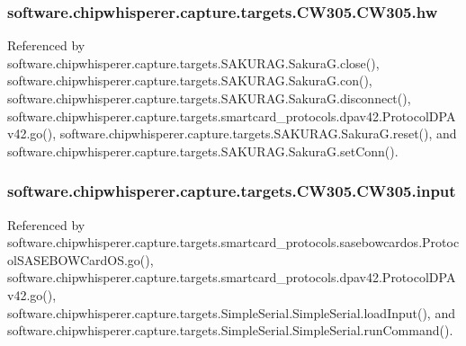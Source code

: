 \subsubsection[{hw}]{\setlength{\rightskip}{0pt plus 5cm}software.\+chipwhisperer.\+capture.\+targets.\+C\+W305.\+C\+W305.\+hw}\label{classsoftware_1_1chipwhisperer_1_1capture_1_1targets_1_1CW305_1_1CW305_a1197c766d752dac05af78820aed5604b}


Referenced by software.\+chipwhisperer.\+capture.\+targets.\+S\+A\+K\+U\+R\+A\+G.\+Sakura\+G.\+close(), software.\+chipwhisperer.\+capture.\+targets.\+S\+A\+K\+U\+R\+A\+G.\+Sakura\+G.\+con(), software.\+chipwhisperer.\+capture.\+targets.\+S\+A\+K\+U\+R\+A\+G.\+Sakura\+G.\+disconnect(), software.\+chipwhisperer.\+capture.\+targets.\+smartcard\+\_\+protocols.\+dpav42.\+Protocol\+D\+P\+Av42.\+go(), software.\+chipwhisperer.\+capture.\+targets.\+S\+A\+K\+U\+R\+A\+G.\+Sakura\+G.\+reset(), and software.\+chipwhisperer.\+capture.\+targets.\+S\+A\+K\+U\+R\+A\+G.\+Sakura\+G.\+set\+Conn().

\hypertarget{classsoftware_1_1chipwhisperer_1_1capture_1_1targets_1_1CW305_1_1CW305_a75d4f386df649261d6ac37923817a366}{}
\subsubsection[{input}]{\setlength{\rightskip}{0pt plus 5cm}software.\+chipwhisperer.\+capture.\+targets.\+C\+W305.\+C\+W305.\+input}\label{classsoftware_1_1chipwhisperer_1_1capture_1_1targets_1_1CW305_1_1CW305_a75d4f386df649261d6ac37923817a366}


Referenced by software.\+chipwhisperer.\+capture.\+targets.\+smartcard\+\_\+protocols.\+sasebowcardos.\+Protocol\+S\+A\+S\+E\+B\+O\+W\+Card\+O\+S.\+go(), software.\+chipwhisperer.\+capture.\+targets.\+smartcard\+\_\+protocols.\+dpav42.\+Protocol\+D\+P\+Av42.\+go(), software.\+chipwhisperer.\+capture.\+targets.\+Simple\+Serial.\+Simple\+Serial.\+load\+Input(), and software.\+chipwhisperer.\+capture.\+targets.\+Simple\+Serial.\+Simple\+Serial.\+run\+Command().

\hypertarget{classsoftware_1_1chipwhisperer_1_1capture_1_1targets_1_1CW305_1_1CW305_a4edb04d12ef348e1d077f944c3d3f9ae}{}
